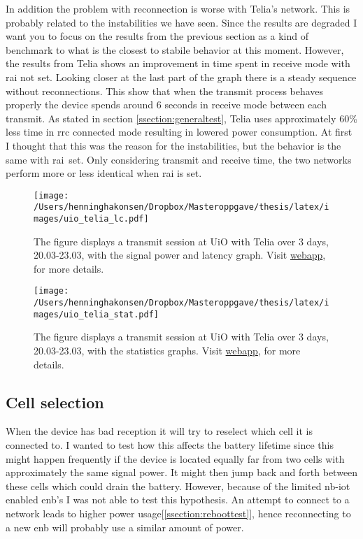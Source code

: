 \documentclass[USenglish]{ifimaster}  %
\begin{document}
In addition the problem with reconnection is worse with Telia's network. This is probably related to the instabilities we have seen. Since the results are degraded I want you to focus on the results from the previous section as a kind of benchmark to what is the closest to stabile behavior at this moment. However, the results from Telia shows an improvement in time spent in receive mode with \acrshort{rai} not set. Looking closer at the last part of the graph there is a steady sequence without reconnections. This show that when the transmit process behaves properly the device spends around 6 seconds in receive mode between each transmit. As stated in section \vref{ssection:generaltest}, Telia uses approximately 60\% less time in \acrshort{rrc} connected mode resulting in lowered power consumption. At first I thought that this was the reason for the instabilities, but the behavior is the same with \acrshort{rai} set. Only considering transmit and receive time, the two networks perform more or less identical when \acrshort{rai} is set.

\begin{figure}[H]
  \centering
  \texttt{[image: /Users/henninghakonsen/Dropbox/Masteroppgave/thesis/latex/images/uio\_telia\_lc.pdf]}
  \caption[Long-term test - Telia 20.03-23.03, signal power and latency]{The figure displays a transmit session at UiO with Telia over 3 days, 20.03-23.03, with the signal power and latency graph. Visit \href{http://158.39.77.97:9000/\#/nodes/id1}{webapp}, for more details.}
  \label{figure:uio_telia_lc}
\end{figure}

\begin{figure}[H]
  \centering
  \texttt{[image: /Users/henninghakonsen/Dropbox/Masteroppgave/thesis/latex/images/uio\_telia\_stat.pdf]}
  \caption[Long-term test - Telia 20.03-23.03, statistics]{The figure displays a transmit session at UiO with Telia over 3 days, 20.03-23.03, with the statistics graphs. Visit \href{http://158.39.77.97:9000/\#/nodes/id1}{webapp}, for more details.}
  \label{figure:uio_telia_stat}
\end{figure}

\subsection{Cell selection}
When the device has bad reception it will try to reselect which cell it is connected to. I wanted to test how this affects the battery lifetime since this might happen frequently if the device is located equally far from two cells with approximately the same signal power. It might then jump back and forth between these cells which could drain the battery. However, because of the limited \acrshort{nb-iot} enabled \acrshort{enb}'s I was not able to test this hypothesis. An attempt to connect to a network leads to higher power usage[\ref{ssection:reboottest}], hence reconnecting to a new \acrshort{enb} will probably use a similar amount of power.
\end{document}
